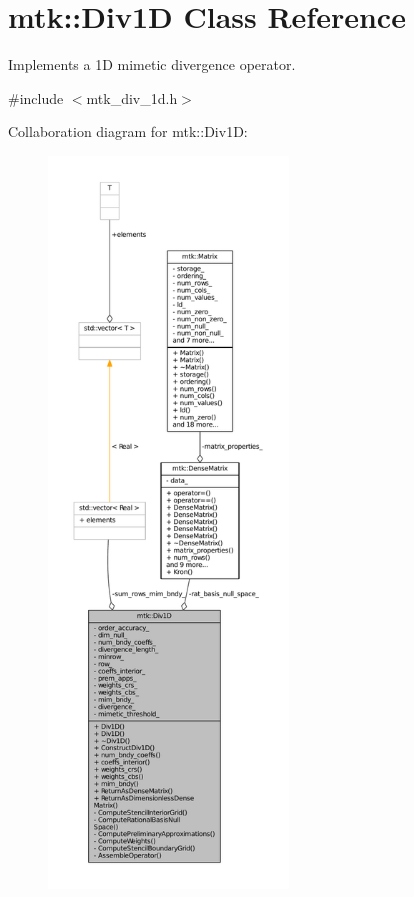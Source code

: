 \hypertarget{classmtk_1_1Div1D}{\section{mtk\+:\+:Div1\+D Class Reference}
\label{classmtk_1_1Div1D}
}


Implements a 1\+D mimetic divergence operator.  




{\ttfamily \#include $<$mtk\+\_\+div\+\_\+1d.\+h$>$}



Collaboration diagram for mtk\+:\+:Div1\+D\+:
\nopagebreak
\begin{figure}[H]
\begin{center}
\leavevmode
\includegraphics[height=550pt]{classmtk_1_1Div1D__coll__graph}
\end{center}
\end{figure}
